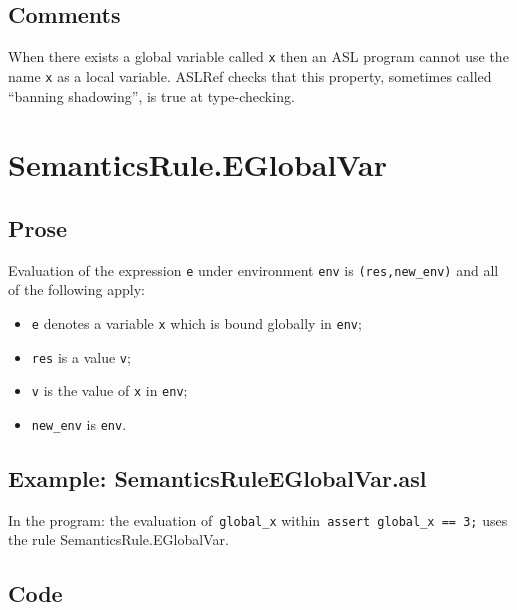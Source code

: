 \documentclass{book}
\begin{document}
  \subsection{Comments}
  When there exists a global variable called \texttt{x} then an ASL program
  cannot use the name \texttt{x} as a local variable. ASLRef checks that this
  property, sometimes called ``banning shadowing'', is true at type-checking.

\section{SemanticsRule.EGlobalVar \label{sec:SemanticsRule.EGlobalVar}}

  \subsection{Prose}
  Evaluation of the expression \texttt{e} under environment \texttt{env} is
  \texttt{(res,new\_env)} and all of the following apply:
  \begin{itemize}
  \item \texttt{e} denotes a variable \texttt{x} which is bound globally in \texttt{env};
  \item \texttt{res} is a value \texttt{v};
  \item \texttt{v} is the value of \texttt{x} in \texttt{env};
  \item \texttt{new\_env} is \texttt{env}.
  \end{itemize}

  \subsection{Example: SemanticsRuleEGlobalVar.asl}
    In the program:
    the evaluation of~\texttt{global\_x} within~\texttt{assert global\_x == 3;}
    uses the rule SemanticsRule.EGlobalVar.


  \subsection{Code}
\end{document}
